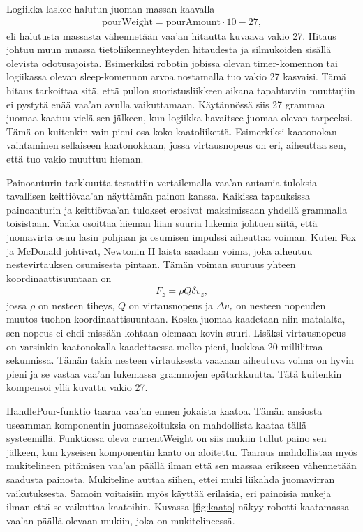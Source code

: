 Logiikka laskee halutun juoman massan kaavalla
\begin{align}
    \mathrm{pourWeight} = \mathrm{pourAmount} \cdot 10 - 27 \mathrm{,}
\end{align}
eli halutusta massasta vähennetään vaa'an hitautta kuvaava vakio 27. Hitaus johtuu muun muassa tietoliikenneyhteyden hitaudesta ja silmukoiden sisällä olevista odotusajoista. Esimerkiksi robotin jobissa olevan timer-komennon tai logiikassa olevan sleep-komennon arvoa nostamalla tuo vakio 27 kasvaisi. Tämä hitaus tarkoittaa sitä, että pullon suoristusliikkeen aikana tapahtuviin muuttujiin ei pystytä enää vaa'an avulla vaikuttamaan. Käytännössä siis 27 grammaa juomaa kaatuu vielä sen jälkeen, kun logiikka havaitsee juomaa olevan tarpeeksi. Tämä on kuitenkin vain pieni osa koko kaatoliikettä. Esimerkiksi kaatonokan vaihtaminen sellaiseen kaatonokkaan, jossa virtausnopeus on eri, aiheuttaa sen, että tuo vakio muuttuu hieman.

Painoanturin tarkkuutta testattiin vertailemalla vaa'an antamia tuloksia tavallisen keittiövaa'an näyttämän painon kanssa. Kaikissa tapauksissa painoanturin ja keittiövaa'an tulokset erosivat maksimissaan yhdellä grammalla toisistaan. Vaaka osoittaa hieman liian suuria lukemia johtuen siitä, että juomavirta osuu lasin pohjaan ja osumisen impulssi aiheuttaa voiman. Kuten Fox ja McDonald \cite[s.197-198]{Fox2011} johtivat, Newtonin II laista saadaan voima, joka aiheutuu nestevirtauksen osumisesta pintaan. Tämän voiman suuruus yhteen koordinaattisuuntaan on
\begin{align}
    F_z = \rho Q \delta v_z \mathrm{,}
\end{align}
jossa $\rho$ on nesteen tiheys, $Q$ on virtausnopeus ja $\Delta v_z$ on nesteen nopeuden muutos tuohon koordinaattisuuntaan. Koska juomaa kaadetaan niin matalalta, sen nopeus ei ehdi missään kohtaan olemaan kovin suuri. Lisäksi virtausnopeus on varsinkin kaatonokalla kaadettaessa melko pieni, luokkaa 20 millilitraa sekunnissa. Tämän takia nesteen virtauksesta vaakaan aiheutuva
voima on hyvin pieni ja se vastaa vaa'an lukemassa grammojen epätarkkuutta. Tätä kuitenkin kompensoi yllä kuvattu vakio 27.

HandlePour-funktio taaraa vaa'an ennen jokaista kaatoa. Tämän ansiosta useamman komponentin juomasekoituksia on mahdollista kaataa tällä systeemillä. Funktiossa oleva currentWeight on siis mukiin tullut paino sen jälkeen, kun kyseisen komponentin kaato on aloitettu. Taaraus mahdollistaa myös mukitelineen pitämisen vaa'an päällä ilman että sen massaa erikseen vähennetään saadusta painosta. Mukiteline auttaa siihen, ettei muki liikahda juomavirran vaikutuksesta. Samoin voitaisiin myös käyttää erilaisia, eri painoisia mukeja ilman että se vaikuttaa kaatoihin. Kuvassa \ref{fig:kaato} näkyy robotti kaatamassa vaa'an päällä olevaan mukiin, joka on mukitelineessä.

